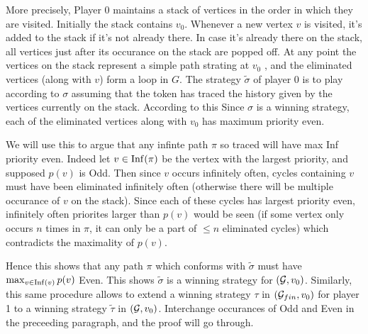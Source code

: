 More precisely, Player 0 maintains a stack of vertices in the order in which they are visited. Initially the stack contains $v_0$. Whenever a new vertex $v$ is visited, it's added to the stack if it's not already there. In case it's already there on the stack, all vertices just after its occurance on the stack are popped off. At any point the vertices on the stack represent a simple path strating at $v_0$ , and the eliminated vertices (along with $v$) form a loop in $G$. The strategy $\tilde{\sigma}$ of player 0 is to play according to $\sigma$ assuming that the token has traced the history given by the vertices currently on the stack. According to this Since $\sigma$ is a winning strategy, each of the eliminated vertices along with $v_0$ has maximum priority even.

We will use this to argue that any infinte path $\pi$ so traced will have max Inf priority even. Indeed let $v \in \operatorname*{Inf}(\pi)$ be the vertex with the largest priority, and supposed $p(v)$ is Odd. Then since $v$ occurs infinitely often, cycles containing $v$ must have been eliminated infinitely often (otherwise there will be multiple occurance of $v$ on the stack). Since each of these cycles has largest priority even, infinitely often priorites larger than $p(v)$ would be seen (if some vertex only occurs $n$ times in $\pi$, it can only be a part of $\leq n$ eliminated cycles) which contradicts the maximality of $p(v)$.

Hence this shows that any path $\pi$ which conforms with $\tilde{\sigma}$ must have $\max_{v \in \operatorname*{Inf}(v)} p(v)$ Even. This shows $\tilde{\sigma}$ is a winning strategy for $(\mathcal{G},v_0)$. Similarly, this same procedure allows to extend a winning strategy $\tau$ in $(\mathcal{G}_{fin}, v_0)$ for player 1 to a winning strategy $\tilde{\tau}$ in $(\mathcal{G},v_0)$. Interchange occurances of Odd and Even in the preceeding paragraph, and the proof will go through.

